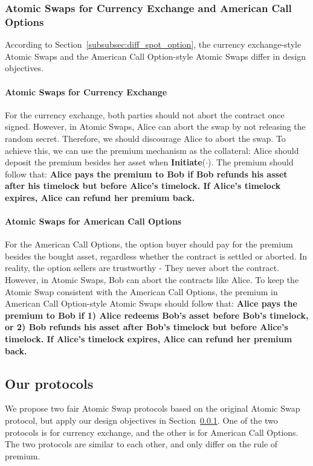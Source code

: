 \subsubsection{Atomic Swaps for Currency Exchange and American Call Options}
\label{subsubsec:design_obj}

According to Section~\ref{subsubsec:diff_spot_option}, the currency exchange-style Atomic Swaps and the American Call Option-style Atomic Swaps differ in design objectives.

\paragraph{Atomic Swaps for Currency Exchange}
For the currency exchange, both parties should not abort the contract once signed.
However, in Atomic Swaps, Alice can abort the swap by not releasing the random secret.
Therefore, we should discourage Alice to abort the swap.
To achieve this, we can use the premium mechanism as the collateral: Alice should deposit the premium besides her asset when \textbf{Initiate}($\cdot$).
The premium should follow that:
\textbf{Alice pays the premium to Bob if Bob refunds his asset after his timelock but before Alice's timelock.
If Alice's timelock expires, Alice can refund her premium back.}

\paragraph{Atomic Swaps for American Call Options}
For the American Call Options, the option buyer should pay for the premium besides the bought asset, regardless whether the contract is settled or aborted.
In reality, the option sellers are trustworthy - They never abort the contract.
However, in Atomic Swaps, Bob can abort the contracts like Alice.
To keep the Atomic Swap consistent with the American Call Options,
the premium in American Call Option-style Atomic Swaps should follow that: 
\textbf{Alice pays the premium to Bob if
1) Alice redeems Bob's asset before Bob's timelock, or
2) Bob refunds his asset after Bob's timelock but before Alice's timelock.
If Alice's timelock expires, Alice can refund her premium back.}











\subsection{Our protocols}
We propose two fair Atomic Swap protocols based on the original Atomic Swap protocol, but apply our design objectives in Section~\ref{subsubsec:design_obj}.
One of the two protocols is for currency exchange, and the other is for American Call Options.
The two protocols are similar to each other, and only differ on the rule of premium. 


